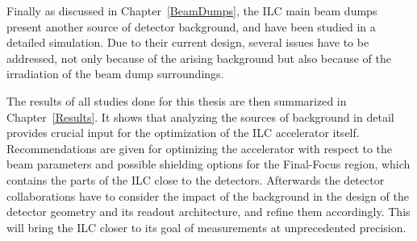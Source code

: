 Finally as discussed in Chapter~\ref{BeamDumps}, the ILC main beam dumps present another source of detector background, and have been studied in a detailed simulation.
Due to their current design, several issues have to be addressed, not only because of the arising background but also because of the irradiation of the beam dump surroundings.

The results of all studies done for this thesis are then summarized in Chapter~\ref{Results}.
It shows that analyzing the sources of background in detail provides crucial input for the optimization of the ILC accelerator itself.
Recommendations are given for optimizing the accelerator with respect to the beam parameters and possible shielding options for the Final-Focus region, which contains the parts of the ILC close to the detectors.
Afterwards the detector collaborations have to consider the impact of the background in the design of the detector geometry and its readout architecture, and refine them accordingly.
This will bring the ILC closer to its goal of measurements at unprecedented precision.
